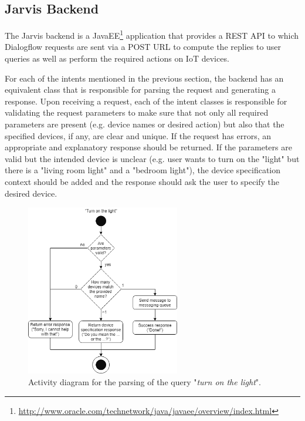 \documentclass[runningheads]{llncs}
\begin{document}
\subsection{Jarvis Backend}

The Jarvis backend is a JavaEE\footnote{\url{http://www.oracle.com/technetwork/java/javaee/overview/index.html}} application that provides a REST API to which Dialogflow requests are sent via a POST URL to compute the replies to user queries as well as perform the required actions on IoT devices.

For each of the intents mentioned in the previous section, the backend has an equivalent class that is responsible for parsing the request and generating a response. Upon receiving a request, each of the intent classes is responsible for validating the request parameters to make sure that not only all required parameters are present (e.g. device names or desired action) but also that the specified devices, if any, are clear and unique. If the request has errors, an appropriate and explanatory response should be returned. If the parameters are valid but the intended device is unclear (e.g. user wants to turn on the "light" but there is a "living room light" and a "bedroom light"), the device specification context should be added and the response should ask the user to specify the desired device.

\begin{figure}
    \begin{center}
        \includegraphics[width=0.6\textwidth]{figures/intent-activity.png}
        \caption{Activity diagram for the parsing of the query "\textit{turn on the light}".} \label{fig:intent-activity}
    \end{center}
\end{figure}
\end{document}
